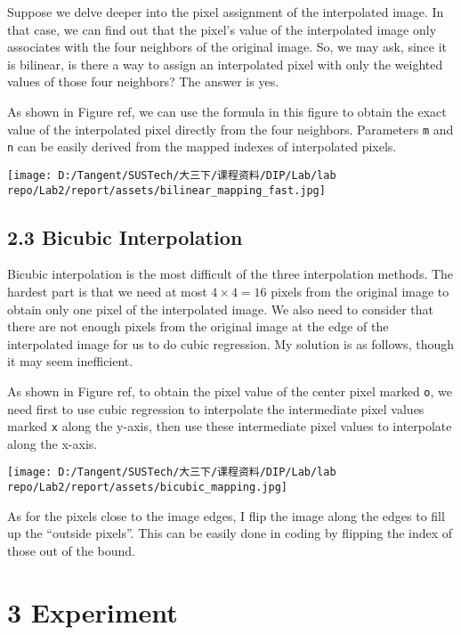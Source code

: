 \documentclass[
]{article}
\begin{document}
Suppose we delve deeper into the pixel assignment of the interpolated
image. In that case, we can find out that the pixel's value of the
interpolated image only associates with the four neighbors of the
original image. So, we may ask, since it is bilinear, is there a way to
assign an interpolated pixel with only the weighted values of those four
neighbors? The answer is yes.

As shown in Figure ref, we can use the formula in this figure to obtain
the exact value of the interpolated pixel directly from the four
neighbors. Parameters \texttt{m} and \texttt{n} can be easily derived
from the mapped indexes of interpolated pixels.

\texttt{[image: D:/Tangent/SUSTech/大三下/课程资料/DIP/Lab/lab repo/Lab2/report/assets/bilinear\_mapping\_fast.jpg]}

\hypertarget{23-bicubic-interpolation}{%
\subsection{2.3 Bicubic Interpolation}\label{23-bicubic-interpolation}}

Bicubic interpolation is the most difficult of the three interpolation
methods. The hardest part is that we need at most \(4\times4=16\) pixels
from the original image to obtain only one pixel of the interpolated
image. We also need to consider that there are not enough pixels from
the original image at the edge of the interpolated image for us to do
cubic regression. My solution is as follows, though it may seem
inefficient.

As shown in Figure ref, to obtain the pixel value of the center pixel
marked \texttt{o}, we need first to use cubic regression to interpolate
the intermediate pixel values marked \texttt{x} along the y-axis, then
use these intermediate pixel values to interpolate along the x-axis.

\texttt{[image: D:/Tangent/SUSTech/大三下/课程资料/DIP/Lab/lab repo/Lab2/report/assets/bicubic\_mapping.jpg]}

As for the pixels close to the image edges, I flip the image along the
edges to fill up the ``outside pixels''. This can be easily done in
coding by flipping the index of those out of the bound.

\hypertarget{3-experiment}{%
\section{3 Experiment}\label{3-experiment}}
\end{document}
